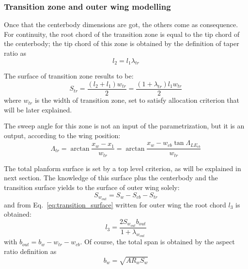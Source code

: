 \subsubsection{Transition zone and outer wing modelling}
\label{subsubsec:chap4_tr_zone_outer_wing_model}

Once that the centerbody dimensions are got, the others come as consequence. 
For continuity, the root chord of the transition zone is equal to the tip chord of the centerbody; the tip chord of this zone is obtained by the definition of taper ratio as
\begin{equation}
	\label{eq:transition_tip_chord}
	l_2 = l_1 \lambda_{tr}
\end{equation}

The surface of transition zone results to be:
\begin{equation}
	\label{eq:transition_surface}
	S_{tr} = \frac{\left(l_2 + l_1\right)w_{tr}}{2} = \frac{\left(1+\lambda_{tr}\right)l_1 w_{tr}}{2}
\end{equation}
where $w_{tr}$ is the width of transition zone, set to satisfy allocation criterion that will be later explained.

The sweep angle for this zone is not an input of the parametrization, but it is an output, according to the wing position:
\begin{equation}
	\label{eq:transition_sweep}
	\Lambda_{tr} = \arctan{\frac{x_w - x_1}{w_{tr}}} = \arctan{\frac{x_w - w_{cb}\tan{\Lambda_{LE_{cb}}}}{w_{tr}}}
\end{equation}

The total planform surface is set by a top level criterion, as will be explained in next section.
The knowledge of this surface plus the centerbody and the transition surface yields to the surface of outer wing solely:
\begin{equation}
	\label{eq:outer_wing_surface}
	S_{w_{out}} = S_w - S_{cb} - S_{tr}
\end{equation}
and from Eq.~\eqref{eq:transition_surface} written for outer wing the root chord $l_3$ is obtained:
\begin{equation}
	\label{eq:l3_out_wing}
	l_3 = \frac{2 S_{w_{out}}b_{out}}{1 + \lambda_{w_{out}}}
\end{equation}
with $b_{out}=b_w - w_{tr} - w_{cb}$. 
Of course, the total span is obtained by the aspect ratio definition as 
\begin{equation}
	\label{eq:total_span}
	b_w = \sqrt{AR_w S_w}
\end{equation}

